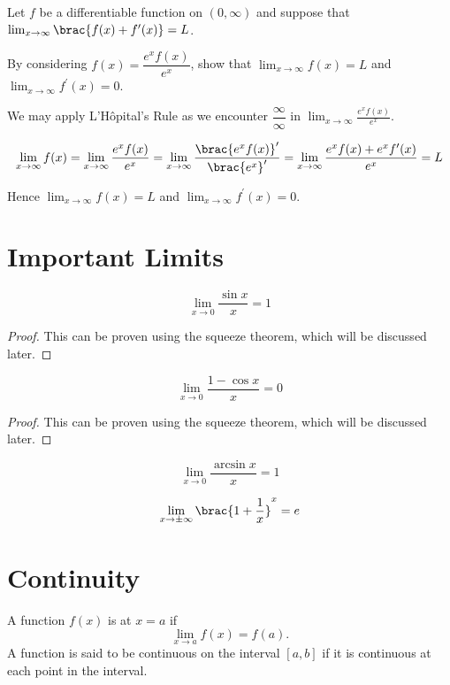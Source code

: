 \begin{exercise}{}{}
Let $f$ be a differentiable function on $(0,\infty)$ and suppose that $\lim_{x\to\infty}\brac{f(x)+f^\prime(x)}=L$.

By considering $f(x)=\dfrac{e^xf(x)}{e^x}$, show that $\lim_{x\to\infty}f(x)=L$ and $\lim_{x\to\infty}f^\prime(x)=0$.
\end{exercise}

\begin{solution}
We may apply L'H\^{o}pital's Rule as we encounter $\dfrac{\infty}{\infty}$ in $\displaystyle\lim_{x\to\infty}\frac{e^xf(x)}{e^x}$.

\[ \lim_{x\to\infty}f(x)=\lim_{x\to\infty}\frac{e^xf(x)}{e^x}=\lim_{x\to\infty}\frac{\brac{e^xf(x)}^\prime}{\brac{e^x}^\prime}=\lim_{x\to\infty}\frac{e^xf(x)+e^xf^\prime(x)}{e^x}=L \]

Hence $\lim_{x\to\infty}f(x)=L$ and $\lim_{x\to\infty}f^\prime(x)=0$.
\end{solution}
\pagebreak



\section{Important Limits}
\begin{equation}
\lim_{x \to 0} \frac{\sin x}{x} = 1
\end{equation}
\begin{proof}
This can be proven using the squeeze theorem, which will be discussed later.
\end{proof}

\begin{equation}
\lim_{x \to 0} \frac{1-\cos x}{x} = 0
\end{equation}
\begin{proof}
This can be proven using the squeeze theorem, which will be discussed later.
\end{proof}

\begin{equation}
\lim_{x\to 0} \frac{\arcsin x}{x} = 1
\end{equation}

\begin{equation}
\lim_{x\to \pm\infty} \brac{1+\frac{1}{x}}^x=e
\end{equation}
\pagebreak

\section{Continuity}
\begin{definition}
A function $f(x)$ is  at $x=a$ if 
\[ \lim_{x\to a} f(x)=f(a). \]
A function is said to be continuous on the interval $[a,b]$ if it is continuous at each point in the interval.
\end{definition}

